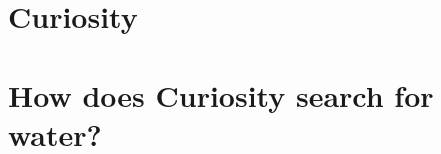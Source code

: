 \documentclass[DIV=calc, paper=a4, fontsize=12pt]{scrartcl}	 %
\begin{document}
{






%




\section{Curiosity}



\section{How does Curiosity search for water?}

\begin{multicols}{2}













\end{multicols}}
\end{document}

